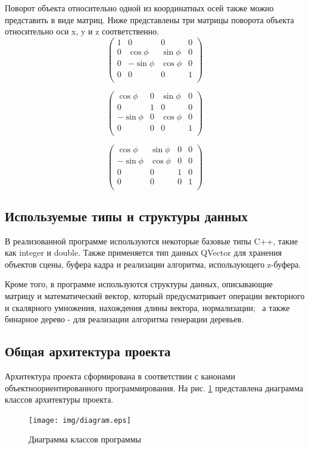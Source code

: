 \documentclass[54pt, a4paper]{article}
\begin{document}
	Поворот объекта относительно одной из координатных осей также можно представить в виде матриц.
	Ниже представлены три матрицы поворота объекта относительно оси x, y и z соответственно.
	$$\begin{pmatrix}
		1 & 0 & 0 & 0\\
		0 & \cos\phi & \sin\phi & 0\\
		0 & -\sin\phi & \cos\phi & 0\\
		0 & 0 & 0 & 1\\
		\label{mtx_x}
	\end{pmatrix} $$
	
	$$\begin{pmatrix}
	\cos\phi & 0 & \sin\phi & 0\\
	0 & 1 & 0 & 0\\
	-\sin\phi & 0 & \cos\phi & 0\\
	0 & 0 & 0 & 1\\
	\label{mtx_y}
	\end{pmatrix} $$
	
	$$\begin{pmatrix}
	\cos\phi & \sin\phi & 0 & 0\\
	-\sin\phi & \cos\phi & 0 & 0\\
	0 & 0 & 1 & 0\\
	0 & 0 & 0 & 1\\
	\label{mtx_z}
	\end{pmatrix} $$
	
	\subsection{Используемые типы и структуры данных}
	В реализованной программе используются некоторые базовые типы C++, такие как integer и double. Также применяется тип данных QVector для хранения объектов сцены, буфера кадра и реализации алгоритма, использующего z-буфера.
	
	Кроме того, в программе используются структуры данных, описывающие
	матрицу и математический вектор, который предусматривает операции векторного
	и скалярного умножения, нахождения длины вектора, нормализации;  а также бинарное дерево - для реализации алгоритма генерации деревьев.
	\newpage
	\subsection{Общая архитектура проекта}
	Архитектура проекта сформирована в соответствии с канонами объектноориентированного программирования. На рис. \ref{ris:model} представлена диаграмма классов архитектуры проекта.
	\begin{figure}[ht!]
		\centering
		\texttt{[image: img/diagram.eps]}
		\caption{Диаграмма классов программы}
		\label{ris:model}
	\end{figure}
\end{document}
